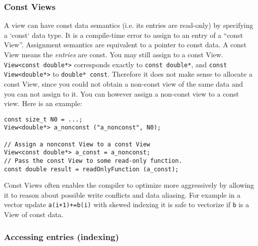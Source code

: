 \subsubsection{Const Views}

A view can have const data semantics (i.e. its entries are read-only) by 
specifying a `const` data type.  It is a compile-time error to assign to an 
entry of a ``const View''.  Assignment semantics are equivalent to a pointer to 
const data.  
A const View means the \emph{entries} are const.  You
may still assign to a const View.  \lstinline!View<const double*>!
corresponds exactly to \lstinline!const double*!, and
\lstinline!const View<double*>! to \lstinline!double* const!.
Therefore it does not make sense to allocate a const View,
since you could not obtain a non-const view of the same data and you 
can not assign to it. You can however assign a non-const view to a const
view.  Here is an example:
\begin{lstlisting}
const size_t N0 = ...;
View<double*> a_nonconst ("a_nonconst", N0);

// Assign a nonconst View to a const View
View<const double*> a_const = a_nonconst;
// Pass the const View to some read-only function.
const double result = readOnlyFunction (a_const);
\end{lstlisting}

Const Views often enables the compiler to optimize more aggressively by allowing it
to reason about possible write conflicts and data aliasing. For example in a vector
update \lstinline|a(i+1)+=b(i)| with skewed indexing it is safe to vectorize if
\lstinline|b| is a View of const data.

\subsubsection{Accessing entries (indexing)}

